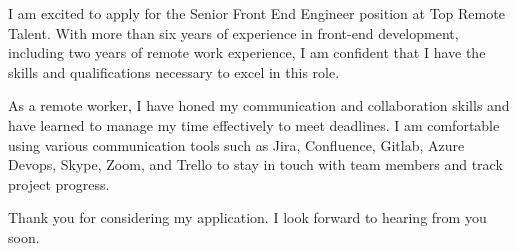 \documentclass[11pt, a4paper]{awesome-cv}
\begin{document}
\begin{cvletter}
I am excited to apply for the Senior Front End Engineer position at Top Remote Talent. With more than six years of experience in front-end development, including two years of remote work experience, I am confident that I have the skills and qualifications necessary to excel in this role.

As a remote worker, I have honed my communication and collaboration skills and have learned to manage my time effectively to meet deadlines. I am comfortable using various communication tools such as Jira, Confluence, Gitlab, Azure Devops, Skype, Zoom, and Trello to stay in touch with team members and track project progress.

Thank you for considering my application. I look forward to hearing from you soon.

\end{cvletter}


\makeletterclosing
\end{document}
